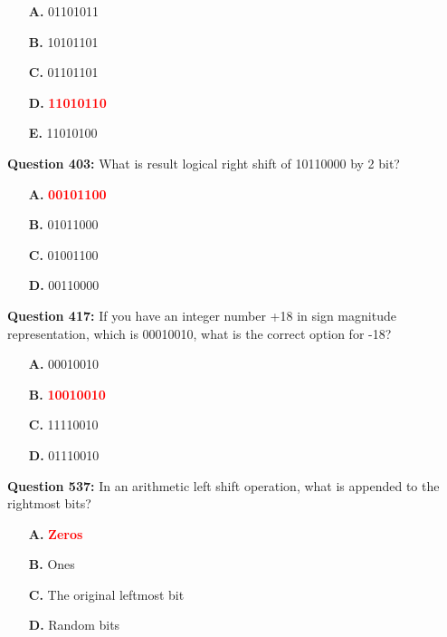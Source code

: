 \documentclass[12pt,a4paper]{article}
\begin{document}
\begin{itemize}
    \item[\textbf{A.}] 01101011
    \item[\textbf{B.}] 10101101
    \item[\textbf{C.}] 01101101
    \item[\textbf{D.}] \textcolor{red}{\textbf{11010110}}
    \item[\textbf{E.}] 11010100
\end{itemize}

\vspace{0.5cm}

\vspace{0.5cm}

\textbf{Question 403:} What is result logical right shift of 10110000 by 2 bit?

\begin{itemize}
    \item[\textbf{A.}] \textcolor{red}{\textbf{00101100}}
    \item[\textbf{B.}] 01011000
    \item[\textbf{C.}] 01001100
    \item[\textbf{D.}] 00110000
\end{itemize}

\vspace{0.5cm}

\vspace{0.5cm}

\textbf{Question 417:} If you have an integer number +18 in sign magnitude representation, which is 00010010, what is the correct option for -18?

\begin{itemize}
    \item[\textbf{A.}] 00010010
    \item[\textbf{B.}] \textcolor{red}{\textbf{10010010}}
    \item[\textbf{C.}] 11110010
    \item[\textbf{D.}] 01110010
\end{itemize}

\vspace{0.5cm}

\vspace{0.5cm}

\textbf{Question 537:} In an arithmetic left shift operation, what is appended to the rightmost bits?

\begin{itemize}
    \item[\textbf{A.}] \textcolor{red}{\textbf{Zeros}}
    \item[\textbf{B.}] Ones
    \item[\textbf{C.}] The original leftmost bit
    \item[\textbf{D.}] Random bits
\end{itemize}
\end{document}
